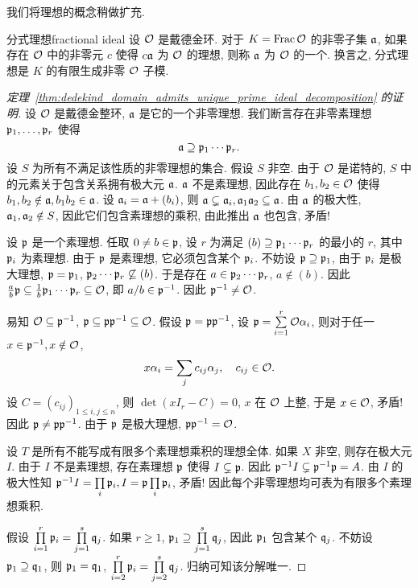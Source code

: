 我们将理想的概念稍做扩充.

\begin{definition}{分式理想}{fractional ideal}
设 $\CO$ 是戴德金环. 对于 $K=\Fr \CO$ 的非零子集 $\fa$, 如果存在 $\CO$ 中的非零元 $c$ 使得 $c\fa$ 为 $\CO$ 的理想, 则称 $\fa$ 为 $\CO$ 的一个. 换言之, 分式理想是 $K$ 的有限生成非零 $\CO$ 子模.
\end{definition}

\begin{proof}[定理~\ref{thm:dedekind_domain_admits_unique_prime_ideal_decomposition} 的证明]
设 $\CO$ 是戴德金整环, $\fa$ 是它的一个非零理想. 我们断言存在非零素理想 $\fp_1,\dots,\fp_r$ 使得 
  \[\fa\supseteq \fp_1\cdots\fp_r.\]
设 $S$ 为所有不满足该性质的非零理想的集合. 假设 $S$ 非空. 由于 $\CO$ 是诺特的, $S$ 中的元素关于包含关系拥有极大元 $\fa$. $\fa$ 不是素理想, 因此存在 $b_1,b_2\in\CO$ 使得 $b_1,b_2\notin\fa,b_1b_2\in\fa$. 设 $\fa_i=\fa+(b_i)$, 则 $\fa\subsetneq \fa_i,\fa_1\fa_2\subseteq \fa$. 由 $\fa$ 的极大性, $\fa_1,\fa_2\notin S$, 因此它们包含素理想的乘积, 由此推出 $\fa$ 也包含, 矛盾!

设 $\fp$ 是一个素理想. 任取 $0\neq b\in\fp$, 设 $r$ 为满足 $(b)\supseteq \fp_1\cdots\fp_r$ 的最小的 $r$, 其中 $\fp_i$ 为素理想. 由于 $\fp$ 是素理想, 它必须包含某个 $\fp_i$. 不妨设 $\fp\supseteq \fp_1$, 由于 $\fp_i$ 是极大理想, $\fp=\fp_1$, $\fp_2\cdots\fp_r\not\subseteq (b)$. 于是存在 $a\in\fp_2\cdots\fp_r$, $a\notin(b)$. 因此 $\frac{a}{b}\fp\subseteq \frac{1}{b}\fp_1\cdots\fp_r\subseteq \CO$, 即 $a/b\in\fp^{-1}$. 因此 $\fp^{-1}\neq\CO$. 

易知 $\CO\subseteq \fp^{-1}$, $\fp\subseteq\fp\fp^{-1}\subseteq\CO$. 假设 $\fp=\fp\fp^{-1}$, 设 $\fp=\suml_{i=1}^r \CO \alpha_i$, 则对于任一 $x\in\fp^{-1},x\notin \CO$,
  \[x\alpha_i=\sum_j c_{ij} \alpha_j,\quad c_{ij}\in \CO.\]
设 $C=(c_{ij})_{1\le i,j\le n}$, 则 $\det(xI_r-C)=0$, $x$ 在 $\CO$ 上整, 于是 $x\in \CO$, 矛盾! 因此 $\fp\neq \fp\fp^{-1}$. 由于 $\fp$ 是极大理想, $\fp\fp^{-1}=\CO$. 

设 $T$ 是所有不能写成有限多个素理想乘积的理想全体. 如果 $X$ 非空, 则存在极大元 $I$. 由于 $I$ 不是素理想, 存在素理想 $\fp$ 使得 $I\subsetneq \fp$. 因此 $\fp^{-1}I\subsetneq \fp^{-1}\fp=A$. 由 $I$ 的极大性知 $\fp^{-1}I=\prod\limits_i \fp_i, I=\fp\prod\limits_i \fp_i$, 矛盾! 因此每个非零理想均可表为有限多个素理想乘积.

假设 $\prod\limits_{i=1}^r\fp_i=\prod\limits_{j=1}^s \fq_j$. 如果 $r\ge 1$, $\fp_1\supseteq \prod\limits_{j=1}^s \fq_j$, 因此 $\fp_1$ 包含某个 $\fq_j$. 不妨设 $\fp_1\supseteq \fq_1$, 则 $\fp_1=\fq_1$, $\prod\limits_{i=2}^r\fp_i=\prod\limits_{j=2}^s \fq_j$. 归纳可知该分解唯一.
\end{proof}

